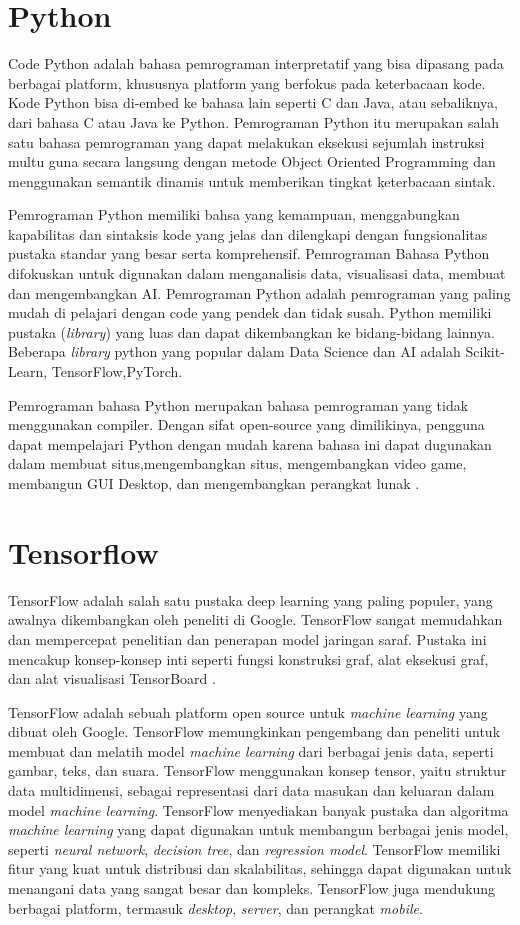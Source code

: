 \section{Python}
Code Python adalah bahasa pemrograman interpretatif yang bisa dipasang pada berbagai platform, khususnya platform yang berfokus pada keterbacaan kode. Kode Python bisa di-embed ke bahasa lain seperti C dan Java, atau sebaliknya, dari bahasa C atau Java ke Python. Pemrograman Python itu merupakan salah satu bahasa pemrograman yang dapat melakukan eksekusi sejumlah instruksi multu guna secara langsung dengan metode Object Oriented Programming dan menggunakan semantik dinamis untuk memberikan tingkat keterbacaan sintak. 

Pemrograman Python memiliki bahsa yang kemampuan, menggabungkan kapabilitas dan sintaksis kode yang jelas dan dilengkapi dengan fungsionalitas pustaka standar yang besar serta komprehensif. Pemrograman Bahasa Python difokuskan untuk digunakan dalam menganalisis data, visualisasi data, membuat dan mengembangkan AI. Pemrograman Python adalah pemrograman yang paling mudah di pelajari dengan code yang pendek dan tidak susah. Python memiliki pustaka (\textit{library}) yang luas dan dapat dikembangkan ke bidang-bidang lainnya. Beberapa \textit{library} python yang popular dalam Data Science dan AI adalah Scikit-Learn, TensorFlow,PyTorch. 

Pemrograman bahasa Python merupakan bahasa pemrograman yang tidak menggunakan compiler. Dengan sifat open-source yang dimilikinya, pengguna dapat mempelajari Python dengan mudah karena bahasa ini dapat dugunakan dalam membuat situs,mengembangkan situs, mengembangkan video game, membangun GUI Desktop, dan mengembangkan perangkat lunak \cite{setiawan2022}.

\section{Tensorflow}
TensorFlow adalah salah satu pustaka deep learning yang paling populer, yang awalnya dikembangkan oleh peneliti di Google. TensorFlow sangat memudahkan dan mempercepat penelitian dan penerapan model jaringan saraf. Pustaka ini mencakup konsep-konsep inti seperti fungsi konstruksi graf, alat eksekusi graf, dan alat visualisasi TensorBoard \cite{bopang2020}.

TensorFlow adalah sebuah platform open source untuk \textit{machine learning} yang dibuat oleh Google. TensorFlow memungkinkan pengembang dan peneliti untuk membuat dan melatih model \textit{machine learning} dari berbagai jenis data, seperti gambar, teks, dan suara. TensorFlow menggunakan konsep tensor, yaitu struktur data multidimensi, sebagai representasi dari data masukan dan keluaran dalam model \textit{machine learning}. TensorFlow menyediakan banyak pustaka dan algoritma \textit{machine learning} yang dapat digunakan untuk membangun berbagai jenis model, seperti \textit{neural network}, \textit{decision tree}, dan \textit{regression model}. TensorFlow memiliki fitur yang kuat untuk distribusi dan skalabilitas, sehingga dapat digunakan untuk menangani data yang sangat besar dan kompleks. TensorFlow juga mendukung berbagai platform, termasuk \textit{desktop}, \textit{server}, dan perangkat \textit{mobile}.
    
